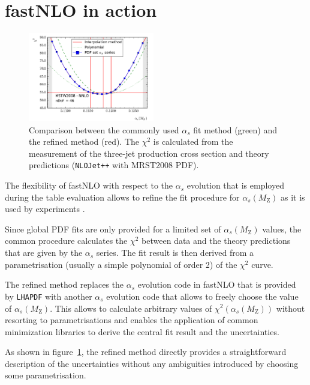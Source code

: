 \documentclass{PoS}
\begin{document}
\section{fastNLO in action}

\begin{figure}
  \centering
  \includegraphics[width=0.49\textwidth]{chi2cmp}
  \caption{Comparison between the commonly used $\alpha_s$ fit method (green)
  and the refined method (red). The $\chi^2$ is calculated from the measurement
  of the three-jet production cross section\cite{CMS:2014mna} and theory predictions (\texttt{NLOJet++} with MRST2008 PDF\cite{Martin:2009iq}).
  }
  \label{Fig:chi2}
\end{figure}
The flexibility of fastNLO with respect to the $\alpha_s$ evolution
that is employed during the table evaluation allows to refine the
fit procedure for $\alpha_s(M_\mathrm{Z})$ as it is used by
experiments\cite{Affolder:2001hn,Chatrchyan:2013txa}
.%

Since global PDF fits are only provided for a limited set of
$\alpha_s(M_\mathrm{Z})$ values, the common procedure calculates the
$\chi^2$ between data and the theory predictions
that are given by the $\alpha_s$ series.
The fit result is then derived from a parametrisation (usually
a simple polynomial of order 2) of the $\chi^2$ curve.

The refined method replaces the
$\alpha_s$ evolution code in fastNLO that is provided by \texttt{LHAPDF} with
another $\alpha_s$ evolution code\cite{GRV} that allows to freely
choose the value of $\alpha_s(M_\mathrm{Z})$. This allows to calculate
arbitrary values of $\chi^2(\alpha_s(M_\mathrm{Z}))$ without resorting
to parametrisations and enables the application of common
minimization libraries to derive the central fit result and the
uncertainties.

As shown in figure~\ref{Fig:chi2}, the refined method directly provides
a straightforward description of the uncertainties without any ambiguities
introduced by choosing some parametrisation.
\end{document}
